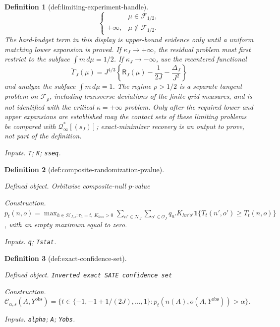 \documentclass{article}
\newtheorem{definition}{Definition}
\begin{document}
\begin{definition}[def:limiting-experiment-handle]
\[\begin{cases}
     &\mu\in\mathcal F_{1/2},\\
 +\infty,&\mu\notin\mathcal F_{1/2}.
 \end{cases}
\]
The hard-budget term in this display is upper-bound evidence only until a uniform matching lower expansion is proved. If \(\kappa_J\to+\infty\), the residual problem must first restrict to the subface \(\int m\,d\mu=1/2\). If \(\kappa_J\to-\infty\), use the recentered functional
\[
 \widetilde\Gamma_J(\mu)
 =J^{4/3}\left\{\mathsf R_J(\mu)-\frac1{2J}-\frac{\Delta_J}{J^2}\right\}
\]
and analyze the subface \(\int m\,d\mu=1\). The regime \(\rho>1/2\) is a separate tangent problem on \(\mathcal F_\rho\), including transverse deviations of the finite-grid measures, and is not identified with the critical \(\kappa=+\infty\) problem. Only after the required lower and upper expansions are established may the contact sets of these limiting problems be compared with \(\mathcal Q^*_{\infty}[(s_J)]\); exact-minimizer recovery is an output to prove, not part of the definition.
\par\smallskip\noindent\emph{Inputs.} \texttt{T}; \texttt{K}; \texttt{sseq}.
\end{definition}

\begin{definition}[def:composite-randomization-pvalue]\label{def:composite-randomization-pvalue}
\par\smallskip\noindent\emph{Defined object.} Orbitwise composite-null \(p\)-value
\par\smallskip\noindent\emph{Construction.} \(p_t(n,o)=\max_{h\in\mathcal H_{J,s}:\tau_h=t,\,K_{hno}>0}\sum_{n'\in\mathcal N_J}\sum_{o'\in\mathcal O_J}q_{n'}K_{hn'o'}\mathbf 1\{T_t(n',o')\ge T_t(n,o)\}\), with an empty maximum equal to zero.
\par\smallskip\noindent\emph{Inputs.} \texttt{q}; \texttt{Tstat}.
\end{definition}

\begin{definition}[def:exact-confidence-set]\label{def:exact-confidence-set}
\par\smallskip\noindent\emph{Defined object.} \texttt{Inverted exact SATE confidence set}
\par\smallskip\noindent\emph{Construction.} \(\mathcal C_{\alpha,s}(A,Y^{\mathrm{obs}})=\{t\in\{-1,-1+1/(2J),\ldots,1\}:p_t(n(A),o(A,Y^{\mathrm{obs}}))>\alpha\}\).
\par\smallskip\noindent\emph{Inputs.} \texttt{alpha}; \texttt{A}; \texttt{Yobs}.
\end{definition}
\end{document}
